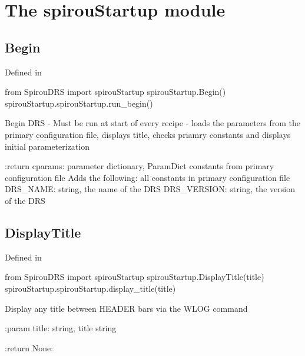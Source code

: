 
\clearpage
\newpage
\noindent\begin{minipage}{\textwidth}
\section{The spirouStartup module}
\label{ch:the_module:spirouStartup}

\subsection{Begin}

Defined in \spirouStartup{}

\begin{pythonbox}
from SpirouDRS import spirouStartup
spirouStartup.Begin()
spirouStartup.spirouStartup.run_begin()
\end{pythonbox}

\begin{pythondocstring}
Begin DRS - Must be run at start of every recipe
- loads the parameters from the primary configuration file, displays
  title, checks priamry constants and displays initial parameterization

:return cparams: parameter dictionary, ParamDict constants from primary
                 configuration file
        Adds the following:
            all constants in primary configuration file
            DRS_NAME: string, the name of the DRS
            DRS_VERSION: string, the version of the DRS
\end{pythondocstring}
\end{minipage}

\noindent\begin{minipage}{\textwidth}
\subsection{DisplayTitle}

Defined in \spirouStartup{}

\begin{pythonbox}
from SpirouDRS import spirouStartup
spirouStartup.DisplayTitle(title)
spirouStartup.spirouStartup.display_title(title)
\end{pythonbox}

\begin{pythondocstring}
Display any title between HEADER bars via the WLOG command

:param title: string, title string

:return None:
\end{pythondocstring}
\end{minipage}

